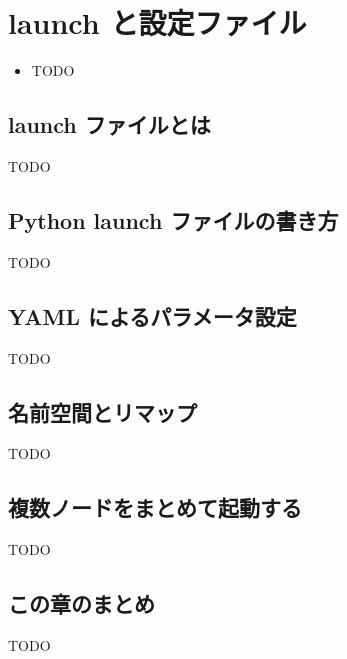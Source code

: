 \chapter{launch と設定ファイル}
\label{chap:launch}

\begin{goalbox}
  \begin{itemize}
    \item TODO
  \end{itemize}
\end{goalbox}

\section{launch ファイルとは}

TODO

\section{Python launch ファイルの書き方}

TODO

\section{YAML によるパラメータ設定}

TODO

\section{名前空間とリマップ}

TODO

\section{複数ノードをまとめて起動する}

TODO

\section*{この章のまとめ}

TODO
